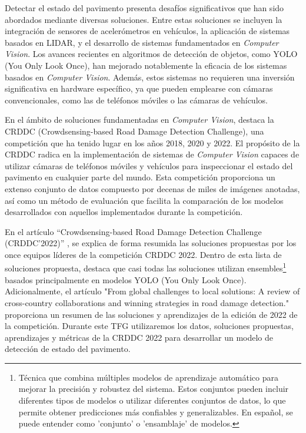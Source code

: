 
Detectar el estado del pavimento presenta desafíos significativos que han sido abordados mediante diversas soluciones. Entre estas soluciones se incluyen la integración de sensores de acelerómetros en vehículos\cite{Pavement_Anomalies_Accelerometer}, la aplicación de sistemas basados en LIDAR\cite{LIDAR_Blasiis}\cite{LIDAR_VanDerHorst}, y el desarrollo de sistemas fundamentados en \textit{Computer Vision}. Los avances recientes en algoritmos de detección de objetos, como YOLO (You Only Look Once), han mejorado notablemente la eficacia de los sistemas basados en \textit{Computer Vision}. Además, estos sistemas no requieren una inversión significativa en hardware específico, ya que pueden emplearse con cámaras convencionales, como las de teléfonos móviles o las cámaras de vehículos.

En el ámbito de soluciones fundamentadas en \textit{Computer Vision}, destaca la CRDDC (Crowdsensing-based Road Damage Detection Challenge), una competición que ha tenido lugar en los años 2018, 2020 y 2022. El propósito de la CRDDC radica en la implementación de sistemas de \textit{Computer Vision} capaces de utilizar cámaras de teléfonos móviles y vehículos para inspeccionar el estado del pavimento en cualquier parte del mundo. Esta competición proporciona un extenso conjunto de datos compuesto por decenas de miles de imágenes anotadas, así como un método de evaluación que facilita la comparación de los modelos desarrollados con aquellos implementados durante la competición.

En el artículo “Crowdsensing-based Road Damage Detection Challenge (CRDDC’2022)” \cite{CRDDC2022_paper}, se explica de forma resumida las soluciones propuestas por los once equipos líderes de la competición CRDDC 2022. Dentro de esta lista de soluciones propuesta, destaca que casi todas las soluciones utilizan ensembles\footnote{Técnica que combina múltiples modelos de aprendizaje automático para mejorar la precisión y robustez del sistema. Estos conjuntos pueden incluir diferentes tipos de modelos o utilizar diferentes conjuntos de datos, lo que permite obtener predicciones más confiables y generalizables. En español, se puede entender como 'conjunto' o 'ensamblaje' de modelos.} basados principalmente en modelos YOLO (You Only Look Once). Adicionalmente, el artículo "From global challenges to local solutions: A review of cross-country collaborations and winning strategies in road damage detection." \cite{CRDDC2022_review} proporciona un resumen de las soluciones y aprendizajes de la edición de 2022 de la competición. Durante este TFG utilizaremos los datos, soluciones propuestas, aprendizajes y métricas de la CRDDC 2022 para desarrollar un modelo de detección de estado del pavimento.

